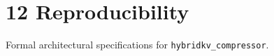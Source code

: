 \section{12 Reproducibility}

Formal architectural specifications for \texttt{hybridkv_compressor}.
